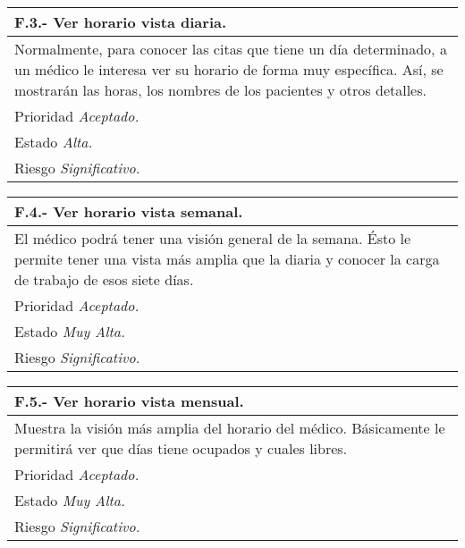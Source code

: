 	\begin{center}
	\begin{tabulary}{15cm}{|L|}
		\hline
			\bf{F.3.- Ver horario vista diaria.} \\
		\hline
			Normalmente, para conocer las citas que tiene un día determinado, a un médico le interesa ver su horario de forma muy específica. Así, se mostrarán las horas, los nombres de los pacientes y otros detalles. \\
		\hline
			Prioridad \textit{Aceptado.} \\
		\hline
			Estado \textit{Alta.} \\
		\hline
			Riesgo \textit{Significativo.} \\
		\hline
	\end{tabulary}
	\end{center}

	\begin{center}
	\begin{tabulary}{15cm}{|L|}
		\hline
			\bf{F.4.- Ver horario vista semanal.} \\
		\hline
			El médico podrá tener una visión general de la semana. Ésto le permite tener una vista más amplia que la diaria y conocer la carga de trabajo de esos siete días. \\
		\hline
			Prioridad \textit{Aceptado.} \\
		\hline
			Estado \textit{Muy Alta.} \\
		\hline
			Riesgo \textit{Significativo.} \\
		\hline
	\end{tabulary}
	\end{center}

	\begin{center}
	\begin{tabulary}{15cm}{|L|}
		\hline
			\bf{F.5.- Ver horario vista mensual.} \\
		\hline
			Muestra la visión más amplia del horario del médico. Básicamente le permitirá ver que días tiene ocupados y cuales libres. \\
		\hline
			Prioridad \textit{Aceptado.} \\
		\hline
			Estado \textit{Muy Alta.} \\
		\hline
			Riesgo \textit{Significativo.} \\
		\hline
	\end{tabulary}
	\end{center}

